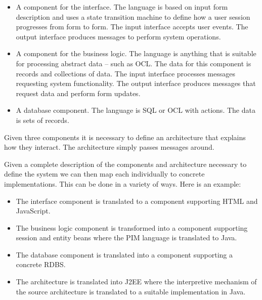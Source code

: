 \documentclass{article}
\begin{document}
\begin{itemize}

\item A component for the interface. The language is based on input form description and
uses a state transition machine to define how a user session progresses from form to
form. The input interface accepts user events. The output interface produces messages
to perform system operations.

\item A component for the business logic. The language is anything that is suitable for processing
abstract data -- such as OCL. The data for this component is records and collections of data.
The input interface processes messages requesting system functionality. The output 
interface produces messages that request data and perform form updates.

\item A database component. The language is SQL or OCL with actions. The data is sets of records.

\end{itemize}
Given three components it is necessary to define an architecture that explains how
they interact. The architecture  simply passes messages around.

Given a complete description of the components and architecture necessary to define the 
system we can then map each individually to concrete implementations. This can be done in
a variety of ways. Here is an example:

\begin{itemize}

\item The interface component is translated to a component supporting HTML and JavaScript.

\item The business logic component is transformed into a component supporting
session and entity beans where the PIM language
is translated to Java.

\item The database component is translated into a component supporting a concrete RDBS.

\item The architecture is translated into J2EE where the interpretive mechanism of the source
architecture is translated to a suitable implementation in Java.

\end{itemize}
\end{document}
